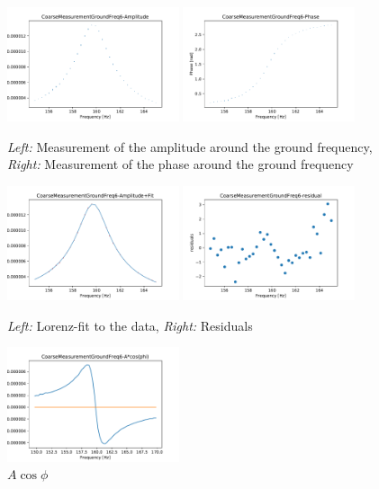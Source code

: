\begin{figure}[h]
	\centering
	\includegraphics[width=0.45\textwidth]{figures/CoarseMeasurementGroundFreq6amp.pdf}
	\includegraphics[width=0.45\textwidth]{figures/CoarseMeasurementGroundFreq6phase.pdf}
	\caption{\emph{Left:} Measurement of the amplitude around the ground frequency, \emph{Right:} Measurement of the phase around the ground frequency}
	\label{fig1}
\end{figure}
\begin{figure}[h]
	\centering
	\includegraphics[width=0.45\textwidth]{figures/CoarseMeasurementGroundFreq6fit.pdf}
	\includegraphics[width=0.45\textwidth]{figures/CoarseMeasurementGroundFreq6residuals.pdf}
	\caption{\emph{Left:} Lorenz-fit to the data, \emph{Right:} Residuals}
	\label{fig2}
\end{figure}
\begin{figure}[h]
	\centering
	\includegraphics[width=0.45\textwidth]{figures/CoarseMeasurementGroundFreq6acos.pdf}
	\caption{$A\cos\phi$}
	\label{fig3}
\end{figure}

